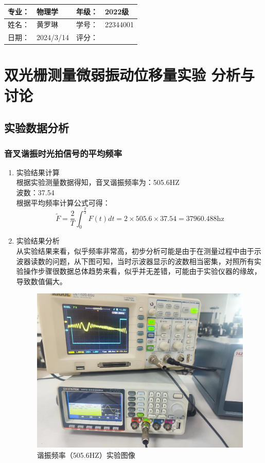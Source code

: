 \documentclass[dvipsnames, svgnames,a4paper,11pt]{article}
\begin{document}
	\begin{table}
		\renewcommand\arraystretch{1.7}
		\begin{tabularx}{\textwidth}{|X|X|X|X|}
			\hline
			专业：& 物理学 &年级：& 2022级\\
			\hline
			姓名： & 黄罗琳 & 学号：& 22344001\\
			\hline
			日期：& 2024/3/14 & 评分： &\\
			\hline
		\end{tabularx}
	\end{table}
	
	\section{双光栅测量微弱振动位移量实验 \quad\heiti  分析与讨论}
	
	\subsection{实验数据分析}
	
	\subsubsection{音叉谐振时光拍信号的平均频率}
	\begin{enumerate}
		\item 实验结果计算\\
		根据实验测量数据得知，音叉谐振频率为：505.6HZ\\
		波数：37.54\\
	    根据平均频率计算公式可得：
	  $$\tilde{F}=\frac{2}{T}\int_{0}^{\frac{T}{2}}F(t)dt=2\times505.6\times37.54=37960.488\text{hz}$$
	  \item 实验结果分析\\
	  从实验结果来看，似乎频率非常高，初步分析可能是由于在测量过程中由于示波器读数的问题，从下图可知，当时示波器显示的波数相当密集，对照所有实验操作步骤很数据总体趋势来看，似乎并无差错，可能由于实验仪器的缘故，导致数值偏大。

	  \begin{figure}[H]
		\centering
		\includegraphics[width=0.4\linewidth]{images/505.6}
		\caption{谐振频率（505.6HZ）实验图像}
		\label{505.6}
	\end{figure}
	  
	\end{enumerate}
	
\end{document}
